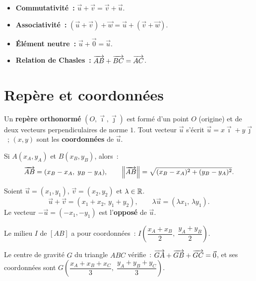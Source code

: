 \begin{prop}
\begin{itemize}
  \item \textbf{Commutativit\'e~:} $\vec{u}+\vec{v}=\vec{v}+\vec{u}$.
  \item \textbf{Associativit\'e~:} $(\vec{u}+\vec{v})+\vec{w}=\vec{u}+(\vec{v}+\vec{w})$.
  \item \textbf{\'El\'ement neutre~:} $\vec{u}+\vec{0}=\vec{u}$.
  \item \textbf{Relation de Chasles~:} $\overrightarrow{AB}+\overrightarrow{BC}=\overrightarrow{AC}$.
\end{itemize}
\end{prop}

\section{Rep\`ere et coordonn\'ees}

\begin{defn}
Un \textbf{rep\`ere orthonorm\'e} $(O, \vec{\imath}, \vec{\jmath})$ est form\'e d'un
point $O$ (origine) et de deux vecteurs perpendiculaires de norme $1$.
Tout vecteur $\vec{u}$ s'\'ecrit $\vec{u} = x\vec{\imath} + y\vec{\jmath}$~;
$(x,y)$ sont les \textbf{coordonn\'ees} de $\vec{u}$.
\end{defn}

\begin{methode}
Si $A(x_A,y_A)$ et $B(x_B,y_B)$, alors~:
$$\overrightarrow{AB} = (x_B-x_A,\; y_B-y_A),\qquad
  \left\|\overrightarrow{AB}\right\| = \sqrt{(x_B-x_A)^2+(y_B-y_A)^2}.$$
\end{methode}

\begin{prop}
Soient $\vec{u}=(x_1,y_1)$, $\vec{v}=(x_2,y_2)$ et $\lambda\in\mathbb{R}$.
$$\vec{u}+\vec{v} = (x_1+x_2,\, y_1+y_2),\qquad
  \lambda\vec{u} = (\lambda x_1,\, \lambda y_1).$$
Le vecteur $-\vec{u} = (-x_1,-y_1)$ est l'\textbf{oppos\'e} de $\vec{u}$.
\end{prop}

\begin{prop}
Le milieu $I$ de $[AB]$ a pour coordonn\'ees~:
$I\!\left(\dfrac{x_A+x_B}{2},\; \dfrac{y_A+y_B}{2}\right).$

\noindent
Le centre de gravit\'e $G$ du triangle $ABC$ v\'erifie~:
$\overrightarrow{GA}+\overrightarrow{GB}+\overrightarrow{GC}=\vec{0}$, et ses coordonn\'ees sont
$G\!\left(\dfrac{x_A+x_B+x_C}{3},\; \dfrac{y_A+y_B+y_C}{3}\right).$
\end{prop}

